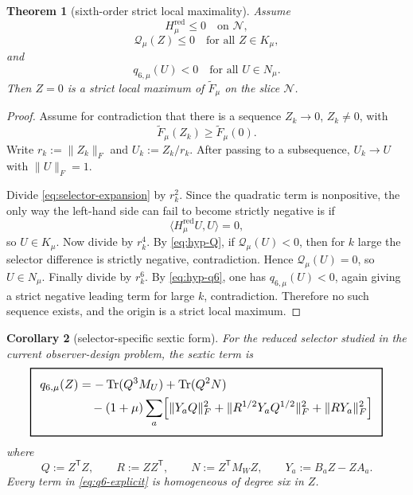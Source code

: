 \documentclass[11pt,a4paper]{article}
\numberwithin{equation}{section}
\DeclareMathOperator{\Tr}{Tr}
\newcommand{\geomboxed}[1]{%
  \setlength{\fboxsep}{8pt}%
  \setlength{\fboxrule}{0.9pt}%
  \fbox{\scalebox{1.10}{$\displaystyle #1$}}%
}
\theoremstyle{thmcompact}
\newtheorem{theorem}{Theorem}[section]
\newtheorem{corollary}[theorem]{Corollary}
\theoremstyle{remark}
\begin{document}
\begin{theorem}[sixth-order strict local maximality]\label{thm:sixth-order}
Assume
\begin{equation}
H_{\mu}^{\mathrm{red}}\le 0 \quad\text{on }\mathcal N,
\label{eq:hyp-H}
\end{equation}
\begin{equation}
\mathcal Q_{\mu}(Z)\le 0 \quad\text{for all } Z\in K_{\mu},
\label{eq:hyp-Q}
\end{equation}
and
\begin{equation}
q_{6,\mu}(U)<0 \quad\text{for all } U\in N_{\mu}.
\label{eq:hyp-q6}
\end{equation}
Then $Z=0$ is a strict local maximum of $\widetilde F_{\mu}$ on the slice $\mathcal N$.
\end{theorem}

\begin{proof}
Assume for contradiction that there is a sequence $Z_k\to0$, $Z_k\ne0$, with
\[
\widetilde F_{\mu}(Z_k)\ge \widetilde F_{\mu}(0).
\]
Write $r_k:=\|Z_k\|_F$ and $U_k:=Z_k/r_k$. After passing to a subsequence, $U_k\to U$ with $\|U\|_F=1$.

Divide \eqref{eq:selector-expansion} by $r_k^2$. Since the quadratic term is nonpositive, the only way the left-hand side can fail to become strictly negative is if
\[
\langle H_{\mu}^{\mathrm{red}}U,U\rangle=0,
\]
so $U\in K_{\mu}$. Now divide by $r_k^4$. By \eqref{eq:hyp-Q}, if $\mathcal Q_{\mu}(U)<0$, then for $k$ large the selector difference is strictly negative, contradiction. Hence $\mathcal Q_{\mu}(U)=0$, so $U\in N_{\mu}$. Finally divide by $r_k^6$. By \eqref{eq:hyp-q6}, one has $q_{6,\mu}(U)<0$, again giving a strict negative leading term for large $k$, contradiction. Therefore no such sequence exists, and the origin is a strict local maximum.
\end{proof}

\begin{corollary}[selector-specific sextic form]\label{cor:selector-sextic}
For the reduced selector studied in the current observer-design problem, the sextic term is
\begin{equation}
\geomboxed{\begin{aligned}
q_{6,\mu}(Z)
&=-\Tr(Q^3M_U)+\Tr(Q^2N)\\
&\quad-(1+\mu)\sum_a
\Bigl[
\|Y_aQ\|_F^2
+\|R^{1/2}Y_aQ^{1/2}\|_F^2
+\|RY_a\|_F^2
\Bigr]
\end{aligned}}
\label{eq:q6-explicit}
\end{equation}
where
\begin{equation}
Q:=Z^{\mathsf T}Z,
\qquad
R:=ZZ^{\mathsf T},
\qquad
N:=Z^{\mathsf T}M_WZ,
\qquad
Y_a:=B_aZ-ZA_a.
\label{eq:q6-defs}
\end{equation}
Every term in \eqref{eq:q6-explicit} is homogeneous of degree six in $Z$.
\end{corollary}
\end{document}
